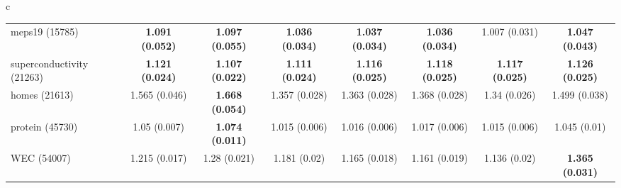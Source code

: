 \documentclass[border=6pt]{standalone}
\begin{document}
\begin{adjustbox}{max width=\linewidth}
\begin{tabular}{c}
\begin{tabular}{lccccccc}
meps19 (15785) & \textbf{1.091 (0.052)} & \textbf{1.097 (0.055)} & \textbf{1.036 (0.034)} & \textbf{1.037 (0.034)} & \textbf{1.036 (0.034)} & 1.007 (0.031) & \textbf{1.047 (0.043)}\\
superconductivity (21263) & \textbf{1.121 (0.024)} & \textbf{1.107 (0.022)} & \textbf{1.111 (0.024)} & \textbf{1.116 (0.025)} & \textbf{1.118 (0.025)} & \textbf{1.117 (0.025)} & \textbf{1.126 (0.025)}\\
homes (21613) & 1.565 (0.046) & \textbf{1.668 (0.054)} & 1.357 (0.028) & 1.363 (0.028) & 1.368 (0.028) & 1.34 (0.026) & 1.499 (0.038)\\
protein (45730) & 1.05 (0.007) & \textbf{1.074 (0.011)} & 1.015 (0.006) & 1.016 (0.006) & 1.017 (0.006) & 1.015 (0.006) & 1.045 (0.01)\\
WEC (54007) & 1.215 (0.017) & 1.28 (0.021) & 1.181 (0.02) & 1.165 (0.018) & 1.161 (0.019) & 1.136 (0.02) & \textbf{1.365 (0.031)}\\
\hline
\end{tabular}
\end{tabular}
\end{adjustbox}
\end{document}
